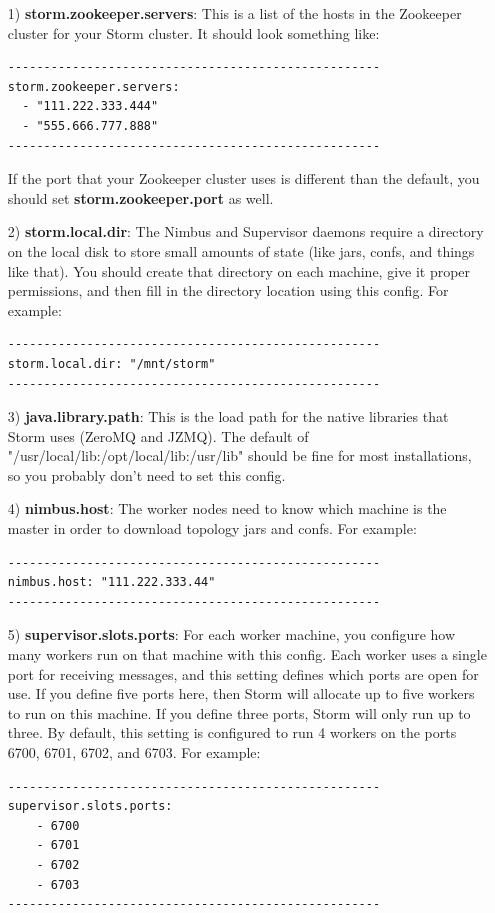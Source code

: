 \documentclass[a4paper, 12pt]{article}
\begin{document}
\begin{itemize}
\item[1)] \textbf{storm.zookeeper.servers}: This is a list of the hosts in the Zookeeper cluster for your Storm cluster. It should look something like:
\begin{lstlisting}
----------------------------------------------------
storm.zookeeper.servers:
  - "111.222.333.444"
  - "555.666.777.888"
----------------------------------------------------
\end{lstlisting}
If the port that your Zookeeper cluster uses is different than the default, you should set \textbf{storm.zookeeper.port} as well.

\item[2)] \textbf{storm.local.dir}: The Nimbus and Supervisor daemons require a directory on the local disk to store small amounts of state (like jars, confs, and things like that). You should create that directory on each machine, give it proper permissions, and then fill in the directory location using this config. For example:
\begin{lstlisting}
----------------------------------------------------
storm.local.dir: "/mnt/storm"
----------------------------------------------------
\end{lstlisting}

\item[3)] \textbf{java.library.path}: This is the load path for the native libraries that Storm uses (ZeroMQ and JZMQ). The default of "/usr/local/lib:/opt/local/lib:/usr/lib" should be fine for most installations, so you probably don't need to set this config.

\item[4)] \textbf{nimbus.host}: The worker nodes need to know which machine is the master in order to download topology jars and confs. For example:
\begin{lstlisting}
----------------------------------------------------
nimbus.host: "111.222.333.44"
----------------------------------------------------
\end{lstlisting} 

\item[5)] \textbf{supervisor.slots.ports}: For each worker machine, you configure how many workers run on that machine with this config. Each worker uses a single port for receiving messages, and this setting defines which ports are open for use. If you define five ports here, then Storm will allocate up to five workers to run on this machine. If you define three ports, Storm will only run up to three. By default, this setting is configured to run 4 workers on the ports 6700, 6701, 6702, and 6703. For example:
\begin{lstlisting}
----------------------------------------------------
supervisor.slots.ports:
    - 6700
    - 6701
    - 6702
    - 6703
----------------------------------------------------
\end{lstlisting} 
\end{itemize}
\end{document}
